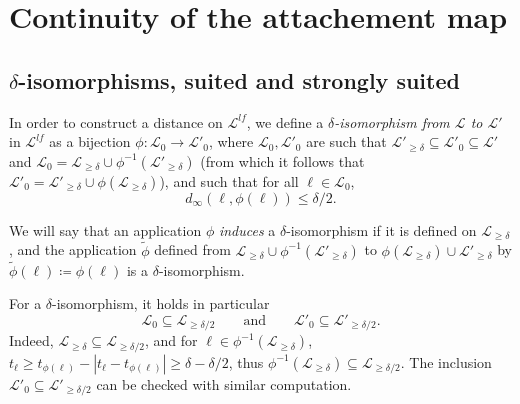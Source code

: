 \documentclass[11pt]{article}
\def\Conf{{\mathscr{R}}}
\begin{document}
\section{Continuity of the attachement map}
\label{sec:continuity}
\subsection{\texorpdfstring{$\delta$}{delta}-isomorphisms, suited and strongly suited}
In order to construct a distance on $\mathscr{L}^{lf}$, we define a {\it $\delta$-isomorphism from $\mathcal{L}$ to $\mathcal{L}'$} in $\mathscr{L}^{lf}$ as a bijection
$\phi:\mathcal{L}_0\to \mathcal{L}'_0$, where $\mathcal{L}_0,\mathcal{L}'_0$ are such that
$\mathcal{L}'_{\geq \delta}\subseteq \mathcal{L}'_0\subseteq \mathcal{L}'$ and $\mathcal{L}_0= \mathcal{L}_{\geq \delta} \cup \phi^{-1}(\mathcal{L}'_{\geq \delta})$
(from which it follows that $\mathcal{L}'_0= \mathcal{L}'_{\geq \delta} \cup \phi(\mathcal{L}_{\geq \delta})$), and such that for all $\ell\in \mathcal{L}_0$, \[d_\infty(\ell,\phi(\ell))\leq\delta/2.\]

We will say that an application $\phi$ {\it induces}  a $\delta$-isomorphism if it is defined on $\mathcal{L}_{\geq \delta}$, and the application $\tilde{\phi}$ defined from $\mathcal{L}_{\geq \delta} \cup \phi^{-1}(\mathcal{L}'_{\geq \delta})$ to
$\phi(\mathcal{L}_{\geq \delta}) \cup \mathcal{L}'_{\geq \delta}$ by $\tilde{\phi}(\ell)\coloneqq\phi(\ell)$ is a $\delta$-isomorphism.

For a $\delta$-isomorphism, it holds in particular
\[ \mathcal{L}_0\subseteq \mathcal{L}_{\geq \delta/2}\qquad \mbox{and} \qquad \mathcal{L}'_0\subseteq \mathcal{L}'_{\geq \delta/2}
.\]
Indeed, $\mathcal{L}_{\geq \delta}\subseteq \mathcal{L}_{\geq \delta/2}$, and for $ \ell\in \phi^{-1}(\mathcal{L}_{\geq \delta})$, $t_\ell\geq t_{\phi(\ell)}-|t_\ell-t_{\phi(\ell)}|\geq  \delta -\delta/2 $,
thus $\phi^{-1}(\mathcal{L}_{\geq \delta})\subseteq  \mathcal{L}_{\geq \delta/2}$.
The inclusion $\mathcal{L}'_0\subseteq \mathcal{L}'_{\geq \delta/2}$ can be checked with similar computation.
\end{document}
